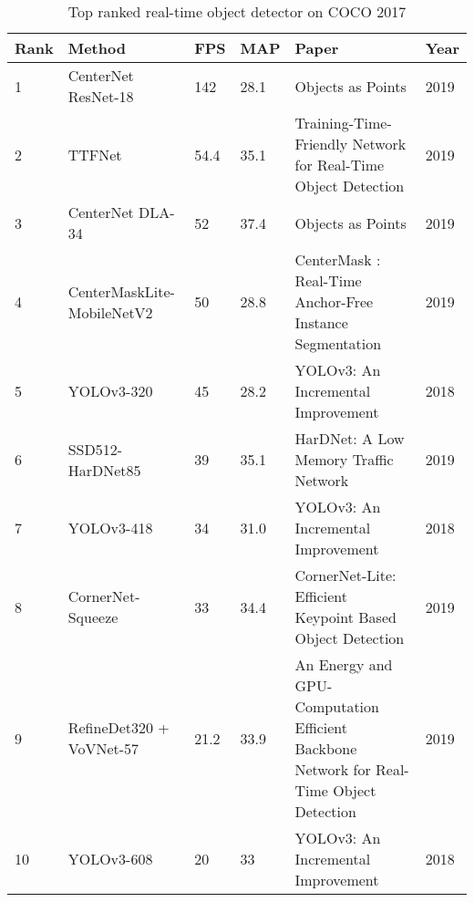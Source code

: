 \documentclass[conference]{IEEEtran}
\begin{document}
\begin{table*}[t]
\centering
\caption{Top ranked real-time object detector on COCO 2017}
\label{detectors}
\begin{tabular}{llllp{9cm}l}
\hline
Rank & Method                     & FPS  & MAP  & Paper                                                                                   & Year \\
\hline
1    & CenterNet ResNet-18        & 142  & 28.1 & Objects as Points                                                                       & 2019 \\
2    & TTFNet                     & 54.4 & 35.1 & Training-Time-Friendly Network for Real-Time Object Detection                           & 2019 \\
3    & CenterNet DLA-34           & 52   & 37.4 & Objects as Points                                                                       & 2019 \\
4    & CenterMaskLite-MobileNetV2 & 50   & 28.8 & CenterMask : Real-Time Anchor-Free Instance Segmentation                                & 2019 \\
5    & YOLOv3-320                 & 45   & 28.2 & YOLOv3: An Incremental Improvement                                                      & 2018 \\
6    & SSD512-HarDNet85           & 39   & 35.1 & HarDNet: A Low Memory Traffic Network                                                   & 2019 \\
7    & YOLOv3-418                 & 34   & 31.0 & YOLOv3: An Incremental Improvement                                                      & 2018 \\
8    & CornerNet-Squeeze          & 33   & 34.4 & CornerNet-Lite: Efficient Keypoint Based Object Detection                               & 2019 \\
9    & RefineDet320 + VoVNet-57   & 21.2 & 33.9 & An Energy and GPU-Computation Efficient Backbone Network for Real-Time Object Detection & 2019 \\
10   & YOLOv3-608                 & 20   & 33   & YOLOv3: An Incremental Improvement                                                      & 2018\\
\hline
\end{tabular}
\end{table*}
\end{document}

